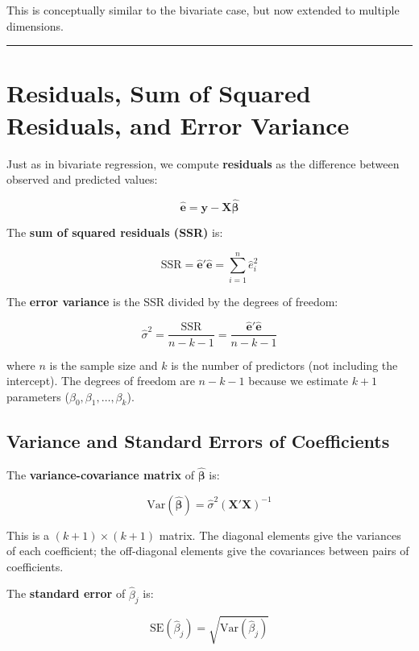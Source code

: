 \documentclass[
  letterpaper,
  DIV=11,
  numbers=noendperiod]{scrreprt}
\begin{document}
This is conceptually similar to the bivariate case, but now extended to
multiple dimensions.

\begin{center}\rule{0.5\linewidth}{0.5pt}\end{center}

\section{Residuals, Sum of Squared Residuals, and Error
Variance}\label{residuals-sum-of-squared-residuals-and-error-variance}

Just as in bivariate regression, we compute \textbf{residuals} as the
difference between observed and predicted values:

\[
\hat{\mathbf{e}} = \mathbf{y} - \mathbf{X} \hat{\boldsymbol{\beta}}
\]

The \textbf{sum of squared residuals (SSR)} is:

\[
\text{SSR} = \hat{\mathbf{e}}' \hat{\mathbf{e}} = \sum_{i=1}^n \hat{e}_i^2
\]

The \textbf{error variance} is the SSR divided by the degrees of
freedom:

\[
\hat{\sigma}^2 = \frac{\text{SSR}}{n - k - 1} = \frac{\hat{\mathbf{e}}' \hat{\mathbf{e}}}{n - k - 1}
\]

where \(n\) is the sample size and \(k\) is the number of predictors
(not including the intercept). The degrees of freedom are \(n - k - 1\)
because we estimate \(k + 1\) parameters
(\(\beta_0, \beta_1, \ldots, \beta_k\)).

\subsection{Variance and Standard Errors of
Coefficients}\label{variance-and-standard-errors-of-coefficients}

The \textbf{variance-covariance matrix} of \(\hat{\boldsymbol{\beta}}\)
is:

\[
\text{Var}(\hat{\boldsymbol{\beta}}) = \hat{\sigma}^2 (\mathbf{X}'\mathbf{X})^{-1}
\]

This is a \((k+1) \times (k+1)\) matrix. The diagonal elements give the
variances of each coefficient; the off-diagonal elements give the
covariances between pairs of coefficients.

The \textbf{standard error} of \(\hat{\beta}_j\) is:

\[
\text{SE}(\hat{\beta}_j) = \sqrt{\text{Var}(\hat{\beta}_j)}
\]
\end{document}
